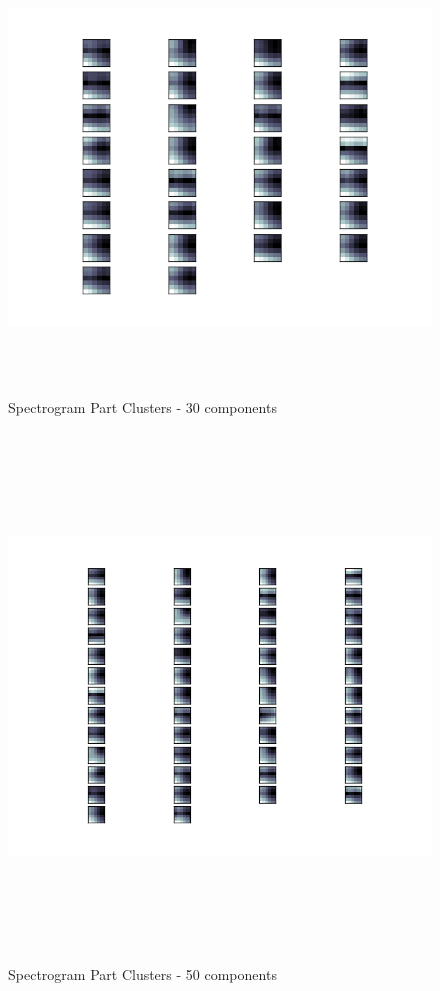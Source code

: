 \documentclass[11pt]{article}
\begin{document}
\begin{figure}[htb]
\centering
\includegraphics[height=12cm]{./spec_avg_parts_30.png}
\caption{\label{fig:spec_avg_parts_30}Spectrogram Part Clusters - 30 components}
\end{figure}

\begin{figure}[htb]
\centering
\includegraphics[height=14cm]{./spec_avg_parts_50.png}
\caption{\label{fig:spec_avg_parts_50}Spectrogram Part Clusters - 50 components}
\end{figure}
\end{document}

